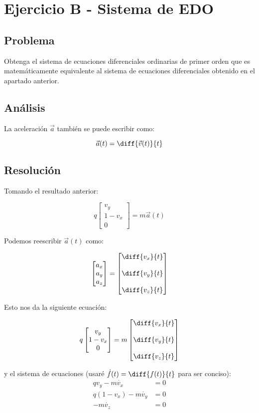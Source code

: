 
\section{Ejercicio B - Sistema de EDO}

\subsection{Problema}

Obtenga el sistema de ecuaciones diferenciales ordinarias de primer orden que es matemáticamente equivalente al sistema de ecuaciones diferenciales obtenido en el apartado anterior.

\subsection{Análisis}

La aceleración $\vec{a}$ también se puede escribir como:

\begin{equation}
	\vec{a}(t) = \diff{\vec{v}(t)}{t}
\end{equation}

\subsection{Resolución}

Tomando el resultado anterior:

$$
	q \begin{bmatrix}
	v_y \\
	1 - v_x \\
	0
\end{bmatrix} = m \vec{a}(t)
$$

Podemos reescribir $\vec{a}(t)$ como:

$$
\begin{bmatrix} a_x \\ a_y \\ a_z \end{bmatrix} =
\begin{bmatrix} 
	\diff{v_x}{t} \\ \\
	\diff{v_y}{t} \\ \\
	\diff{v_z}{t} 
\end{bmatrix}
$$

Esto nos da la siguiente ecuación:

$$
q \begin{bmatrix}
	v_y \\
	1 - v_x \\
	0
\end{bmatrix} = m \begin{bmatrix} 
\diff{v_x}{t} \\ \\
\diff{v_y}{t} \\ \\
\diff{v_z}{t} 
\end{bmatrix}
$$

y el sistema de ecuaciones (usaré $\dot{f}(t) = \diff{f(t)}{t}$ para ser conciso):
\begin{align*}
	q v_y - m \dot{v_x} &= 0 \\
	q(1 - v_x) - m \dot{v_y} &= 0 \\
	-m \dot{v_z} &= 0
\end{align*}
	